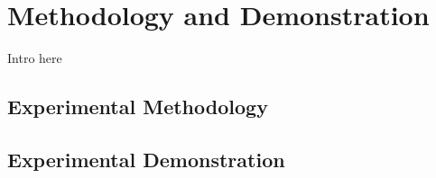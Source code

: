 \chapter{Methodology and Demonstration}
\label{ch:demo_method}

Intro here

\section{Experimental Methodology}
\label{sec:expmeth}


\section{Experimental Demonstration}
\label{sec:expdemo}


